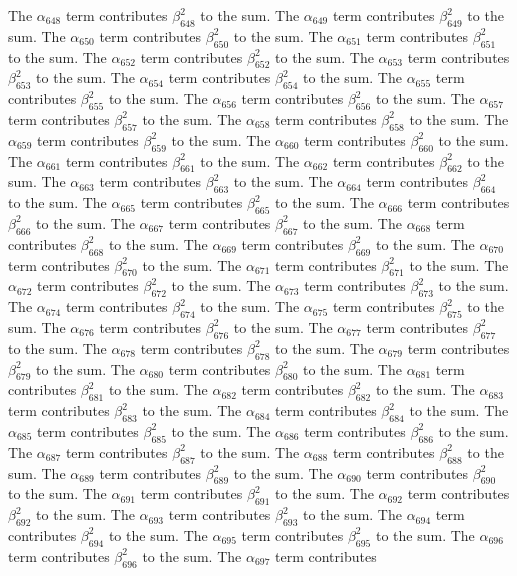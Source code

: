 \begin{lemma}
The $\alpha_{648}$ term contributes $\beta_{648}^{2}$ to the sum. The $\alpha_{649}$ term contributes $\beta_{649}^{2}$ to the sum. The $\alpha_{650}$ term contributes $\beta_{650}^{2}$ to the sum. The $\alpha_{651}$ term contributes $\beta_{651}^{2}$ to the sum. The $\alpha_{652}$ term contributes $\beta_{652}^{2}$ to the sum. The $\alpha_{653}$ term contributes $\beta_{653}^{2}$ to the sum. The $\alpha_{654}$ term contributes $\beta_{654}^{2}$ to the sum. The $\alpha_{655}$ term contributes $\beta_{655}^{2}$ to the sum. The $\alpha_{656}$ term contributes $\beta_{656}^{2}$ to the sum. The $\alpha_{657}$ term contributes $\beta_{657}^{2}$ to the sum. The $\alpha_{658}$ term contributes $\beta_{658}^{2}$ to the sum. The $\alpha_{659}$ term contributes $\beta_{659}^{2}$ to the sum. The $\alpha_{660}$ term contributes $\beta_{660}^{2}$ to the sum. The $\alpha_{661}$ term contributes $\beta_{661}^{2}$ to the sum. The $\alpha_{662}$ term contributes $\beta_{662}^{2}$ to the sum. The $\alpha_{663}$ term contributes $\beta_{663}^{2}$ to the sum. The $\alpha_{664}$ term contributes $\beta_{664}^{2}$ to the sum. The $\alpha_{665}$ term contributes $\beta_{665}^{2}$ to the sum. The $\alpha_{666}$ term contributes $\beta_{666}^{2}$ to the sum. The $\alpha_{667}$ term contributes $\beta_{667}^{2}$ to the sum. The $\alpha_{668}$ term contributes $\beta_{668}^{2}$ to the sum. The $\alpha_{669}$ term contributes $\beta_{669}^{2}$ to the sum. The $\alpha_{670}$ term contributes $\beta_{670}^{2}$ to the sum. The $\alpha_{671}$ term contributes $\beta_{671}^{2}$ to the sum. The $\alpha_{672}$ term contributes $\beta_{672}^{2}$ to the sum. The $\alpha_{673}$ term contributes $\beta_{673}^{2}$ to the sum. The $\alpha_{674}$ term contributes $\beta_{674}^{2}$ to the sum. The $\alpha_{675}$ term contributes $\beta_{675}^{2}$ to the sum. The $\alpha_{676}$ term contributes $\beta_{676}^{2}$ to the sum. The $\alpha_{677}$ term contributes $\beta_{677}^{2}$ to the sum. The $\alpha_{678}$ term contributes $\beta_{678}^{2}$ to the sum. The $\alpha_{679}$ term contributes $\beta_{679}^{2}$ to the sum. The $\alpha_{680}$ term contributes $\beta_{680}^{2}$ to the sum. The $\alpha_{681}$ term contributes $\beta_{681}^{2}$ to the sum. The $\alpha_{682}$ term contributes $\beta_{682}^{2}$ to the sum. The $\alpha_{683}$ term contributes $\beta_{683}^{2}$ to the sum. The $\alpha_{684}$ term contributes $\beta_{684}^{2}$ to the sum. The $\alpha_{685}$ term contributes $\beta_{685}^{2}$ to the sum. The $\alpha_{686}$ term contributes $\beta_{686}^{2}$ to the sum. The $\alpha_{687}$ term contributes $\beta_{687}^{2}$ to the sum. The $\alpha_{688}$ term contributes $\beta_{688}^{2}$ to the sum. The $\alpha_{689}$ term contributes $\beta_{689}^{2}$ to the sum. The $\alpha_{690}$ term contributes $\beta_{690}^{2}$ to the sum. The $\alpha_{691}$ term contributes $\beta_{691}^{2}$ to the sum. The $\alpha_{692}$ term contributes $\beta_{692}^{2}$ to the sum. The $\alpha_{693}$ term contributes $\beta_{693}^{2}$ to the sum. The $\alpha_{694}$ term contributes $\beta_{694}^{2}$ to the sum. The $\alpha_{695}$ term contributes $\beta_{695}^{2}$ to the sum. The $\alpha_{696}$ term contributes $\beta_{696}^{2}$ to the sum. The $\alpha_{697}$ term contributes 
\end{lemma}
